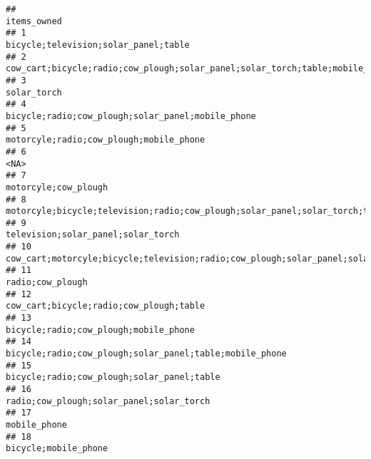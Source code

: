 \documentclass[
]{article}
\begin{document}
\begin{verbatim}
##                                                                                                                                  items_owned
## 1                                                                                                       bicycle;television;solar_panel;table
## 2                                                               cow_cart;bicycle;radio;cow_plough;solar_panel;solar_torch;table;mobile_phone
## 3                                                                                                                                solar_torch
## 4                                                                                          bicycle;radio;cow_plough;solar_panel;mobile_phone
## 5                                                                                                    motorcyle;radio;cow_plough;mobile_phone
## 6                                                                                                                                       <NA>
## 7                                                                                                                       motorcyle;cow_plough
## 8                                                         motorcyle;bicycle;television;radio;cow_plough;solar_panel;solar_torch;table;fridge
## 9                                                                                                         television;solar_panel;solar_torch
## 10                                                      cow_cart;motorcyle;bicycle;television;radio;cow_plough;solar_panel;solar_torch;table
## 11                                                                                                                          radio;cow_plough
## 12                                                                                                   cow_cart;bicycle;radio;cow_plough;table
## 13                                                                                                     bicycle;radio;cow_plough;mobile_phone
## 14                                                                                   bicycle;radio;cow_plough;solar_panel;table;mobile_phone
## 15                                                                                                bicycle;radio;cow_plough;solar_panel;table
## 16                                                                                                  radio;cow_plough;solar_panel;solar_torch
## 17                                                                                                                              mobile_phone
## 18                                                                                                                      bicycle;mobile_phone

\end{verbatim}
\end{document}
